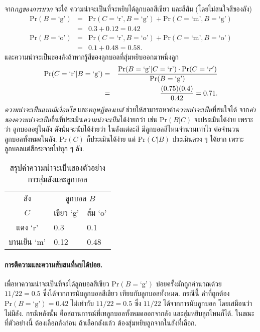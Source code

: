 จาก\textit{กฎของการบวก}
จะได้ ความน่าจะเป็นที่จะหยิบได้ลูกบอลสีเขียว และสีส้ม (โดยไม่สนใจสีของลัง)
\begin{eqnarray}
\mathrm{Pr}(B = \mbox{`g'}) &=& \mathrm{Pr}(C = \mbox{`r'}, B = \mbox{`g'}) + \mathrm{Pr}(C = \mbox{`m'}, B = \mbox{`g'})
\nonumber \\
&=& 0.3 + 0.12 = 0.42
\nonumber \\
\mathrm{Pr}(B = \mbox{`o'}) &=& \mathrm{Pr}(C = \mbox{`r'}, B = \mbox{`o'}) + \mathrm{Pr}(C = \mbox{`m'}, B = \mbox{`o'})
\nonumber \\
&=& 0.1 + 0.48 = 0.58
\nonumber .
\end{eqnarray}
และความน่าจะเป็นของลังถ้าหากรู้สีของลูกบอลที่สุ่มหยิบออกมาหนึ่งลูก
\begin{eqnarray}
\mathrm{Pr}(C = \mbox{`r'}|B = \mbox{`g'}) &=& \frac{\mathrm{Pr}(B = \mbox{`g'}|C = \mbox{`r'})
	\cdot \mathrm{Pr}(C = `r')}{\mathrm{Pr}(B = \mbox{`g'})}
\nonumber \\
&=& \frac{(0.75) (0.4)}{0.42} = 0.71
\nonumber . 
\end{eqnarray}
\textit{ความน่าจะเป็นแบบมีเงื่อนไข} และ\textit{ทฤษฎีของเบส์}
ช่วยให้สามารถหาค่า\textit{ความน่าจะเป็น}ที่สนใจได้
จาก\textit{ค่าของความน่าจะเป็น}อื่นที่ประเมิน\textit{ความน่าจะเป็น}ได้ง่ายกว่า
เช่น
$\mathrm{Pr}(B|C)$ จะประเมินได้ง่าย 
เพราะว่า ลูกบอลอยู่ในลัง ดังนั้นจะนับได้ง่ายว่า ในลังแต่ละสี มีลูกบอลสีไหนจำนวนเท่าไร ต่อจำนวนลูกบอลทั้งหมดในลัง.
$\mathrm{Pr}(C)$ ก็ประเมินได้ง่าย 
แต่ $\mathrm{Pr}(C|B)$ ประเมินตรง ๆ ได้ยาก
เพราะลูกบอลแต่สีกระจายไปทุก ๆ ลัง.

\begin{table}[hbtp]
	\caption[สรุปค่าความน่าจะเป็นร่วม]{สรุปค่าความน่าจะเป็นของตัวอย่างการสุ่มลังและลูกบอล}
	\begin{center}
		\begin{tabular}{|c|l|l|}
			\hline 
			ลัง & \multicolumn{2}{c|}{ลูกบอล $B$ } \\
			\cline{2-3}
			$C$ & เขียว `g' & ส้ม `o' \\
			\hline
			แดง `r' & 0.3 & 0.1 \\
			\hline
			บานเย็น `m' & 0.12 & 0.48 \\
			\hline
		\end{tabular} 
	\end{center}
	\label{tbl: prob cond prob table}
\end{table}


\paragraph{การตีความและความสับสนที่พบได้บ่อย.}
เพื่อหาความน่าจะเป็นที่จะได้ลูกบอลสีเขียว
$\mathrm{Pr}(B = \mbox{`g'})$
บ่อยครั้งมักถูกคำนวณด้วย
$11/22 = 0.5$ 
ซึ่งได้จากการนับลูกบอลสีเขียว เทียบกับลูกบอลทั้งหมด.
กรณีนี้
ค่าที่ถูกต้อง $\mathrm{Pr}(B = \mbox{`g'}) = 0.42$ 
ไม่เท่ากับ 
$11/22 = 0.5$ 
ซึ่ง $11/22$ ได้จากการนับลูกบอล
โดยเสมือนว่าไม่มีลัง.
กรณีหลังนั้น คือสถานการณ์ที่เทลูกบอลทั้งหมดออกจากลัง และสุ่มหยิบลูกไหนก็ได้.
ในขณะที่ตัวอย่างนี้ ต้องเลือกลังก่อน
ถ้าเลือกลังแล้ว ต้องสุ่มหยิบลูกจากในลังที่เลือก.

